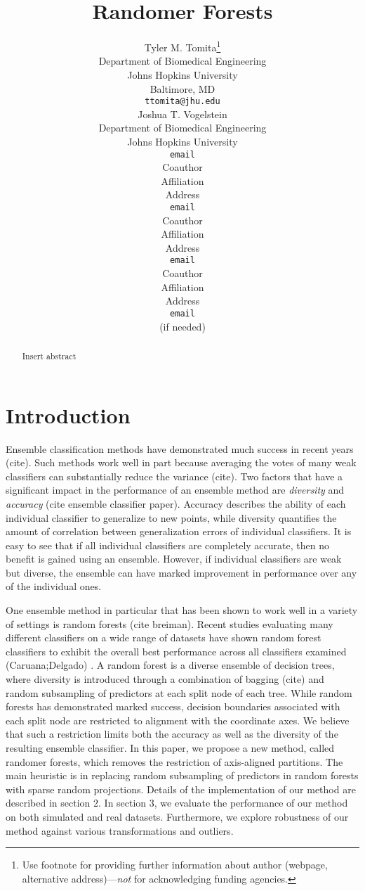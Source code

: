 \documentclass{article} %
\title{Randomer Forests}
\author{
Tyler M. Tomita\thanks{ Use footnote for providing further information
about author (webpage, alternative address)---\emph{not} for acknowledging
funding agencies.} \\
Department of Biomedical Engineering\\
Johns Hopkins University\\
Baltimore, MD \\
\texttt{ttomita@jhu.edu} \\
\And
Joshua T. Vogelstein \\
Department of Biomedical Engineering \\
Johns Hopkins University \\
\texttt{email} \\
\AND
Coauthor \\
Affiliation \\
Address \\
\texttt{email} \\
\And
Coauthor \\
Affiliation \\
Address \\
\texttt{email} \\
\And
Coauthor \\
Affiliation \\
Address \\
\texttt{email} \\
(if needed)\\
}
\begin{document}
\maketitle

\begin{abstract}
Insert abstract
\end{abstract}

\section{Introduction}
Ensemble classification methods have demonstrated much success in recent years (cite). Such methods work well in part because averaging the votes of many weak classifiers can substantially reduce the variance (cite). Two factors that have a significant impact in the performance of an ensemble method are \textit{diversity} and \textit{accuracy} (cite ensemble classifier paper). Accuracy describes the ability of each individual classifier to generalize to new points, while diversity quantifies the amount of correlation between generalization errors of individual classifiers. It is easy to see that if all individual classifiers are completely accurate, then no benefit is gained using an ensemble. However, if individual classifiers are weak but diverse, the ensemble can have marked improvement in performance over any of the individual ones.

One ensemble method in particular that has been shown to work well in a variety of settings is random forests (cite breiman). Recent studies evaluating many different classifiers on a wide range of datasets have shown random forest classifiers to exhibit the overall best performance across all classifiers examined (Caruana;Delgado) . A random forest is a diverse ensemble of decision trees, where diversity is introduced through a combination of bagging (cite) and random subsampling of predictors at each split node of each tree. While random forests has demonstrated marked success, decision boundaries associated with each split node are restricted to alignment with the coordinate axes. We believe that such a restriction limits both the accuracy as well as the diversity of the resulting ensemble classifier. In this paper, we propose a new method, called randomer forests, which removes the restriction of axis-aligned partitions. The main heuristic is in replacing random subsampling of predictors in random forests with sparse random projections. Details of the implementation of our method are described in section 2. In section 3, we evaluate the performance of our method on both simulated and real datasets. Furthermore, we explore robustness of our method against various transformations and outliers.
\end{document}
